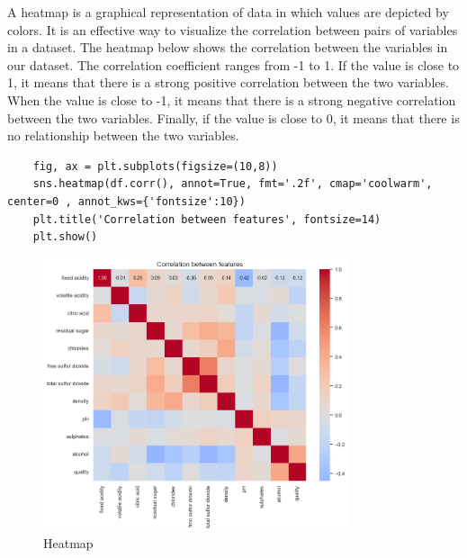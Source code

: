 \documentclass{report}
\begin{document}
\pagebreak

A heatmap is a graphical representation of data in which values are depicted by colors. It is an effective way to visualize the correlation between pairs of variables in a dataset. The heatmap below shows the correlation between the variables in our dataset. The correlation coefficient ranges from -1 to 1. If the value is close to 1, it means that there is a strong positive correlation between the two variables. When the value is close to -1, it means that there is a strong negative correlation between the two variables. Finally, if the value is close to 0, it means that there is no relationship between the two variables.

\begin{lstlisting}
    fig, ax = plt.subplots(figsize=(10,8))
    sns.heatmap(df.corr(), annot=True, fmt='.2f', cmap='coolwarm', center=0 , annot_kws={'fontsize':10})
    plt.title('Correlation between features', fontsize=14)
    plt.show()
\end{lstlisting}

\begin{figure}
    \centering
    \includegraphics[width=0.8\textwidth]{images/16.png}
    \caption{Heatmap}
    \label{fig:heatmap}
\end{figure}


\end{document}

